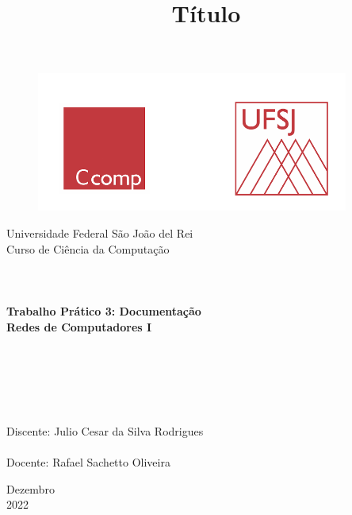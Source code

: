 \documentclass[a4paper, 12pt]{article}
\begin{document}

\begin{titlepage}
	\begin{center}
	
	\begin{figure}[ht]
    \centering
    \includegraphics[width=.44\textwidth]{Images/LogoUFSJ.PNG}
    \label{fig:Capturar.PNG}
    \end{figure}

    	\Huge{Universidade Federal São João del Rei}\\
		\Large{Curso de Ciência da Computação}\\ 

        \vspace{110pt}
        \textbf{\LARGE{
        \\
        \\
        \\
        Trabalho Prático 3: Documentação\\
        \vspace{0.5cm}
        \Large{Redes de Computadores I}
        \\
        \\
        \\
        }}
        
		\title{{\large{Título}}}
		\vspace{2.5cm}
	\end{center}
	    
    \begin{flushleft}
		\begin{tabbing}
		\\
		\\
		\\	
		\large{Discente: Julio Cesar da Silva Rodrigues}\\
	    \\
		\large{Docente: Rafael Sachetto Oliveira}\\
	    \end{tabbing}
    \end{flushleft}
	\vspace{1cm}
	
	\begin{center}
		\vspace{\fill}
			Dezembro\\
		    2022
	\end{center}
\end{titlepage}
\end{document}
